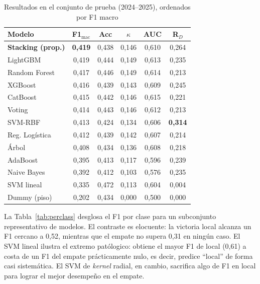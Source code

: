 \documentclass[conference]{IEEEtran}
\begin{document}
\begin{table}[t]
\caption{Resultados en el conjunto de prueba (2024--2025), ordenados por F1 macro}
\label{tab:results}
\centering
\footnotesize
\begin{tabular}{@{}lccccc@{}}
\toprule
\textbf{Modelo} & \textbf{F1$_\text{mac}$} & \textbf{Acc} & \textbf{$\kappa$} & \textbf{AUC} & \textbf{R$_D$} \\
\midrule
\textbf{Stacking (prop.)} & \textbf{0,419} & 0,438 & 0,146 & 0,610 & 0,264 \\
LightGBM        & 0,419 & 0,444 & 0,149 & 0,613 & 0,235 \\
Random Forest   & 0,417 & 0,446 & 0,149 & 0,614 & 0,213 \\
XGBoost         & 0,416 & 0,439 & 0,143 & 0,609 & 0,245 \\
CatBoost        & 0,415 & 0,442 & 0,146 & 0,615 & 0,221 \\
Voting          & 0,414 & 0,443 & 0,146 & 0,612 & 0,213 \\
SVM-RBF         & 0,413 & 0,424 & 0,134 & 0,606 & \textbf{0,314} \\
Reg. Log\'istica & 0,412 & 0,439 & 0,142 & 0,607 & 0,214 \\
\'Arbol         & 0,408 & 0,434 & 0,136 & 0,608 & 0,218 \\
AdaBoost        & 0,395 & 0,413 & 0,117 & 0,596 & 0,239 \\
Naive Bayes     & 0,392 & 0,412 & 0,103 & 0,576 & 0,235 \\
SVM lineal      & 0,335 & 0,472 & 0,113 & 0,604 & 0,004 \\
Dummy (piso)    & 0,202 & 0,434 & 0,000 & 0,500 & 0,000 \\
\bottomrule
\end{tabular}
\end{table}

La Tabla~\ref{tab:perclass} desglosa el F1 por clase para un subconjunto representativo de
modelos. El contraste es elocuente: la victoria local alcanza un F1 cercano a 0,52, mientras
que el empate no supera 0,31 en ning\'un caso. El SVM lineal ilustra el extremo pat\'ologico:
obtiene el mayor F1 de local (0,61) a costa de un F1 del empate pr\'acticamente nulo, es
decir, predice ``local'' de forma casi sistem\'atica. El SVM de \emph{kernel} radial, en
cambio, sacrifica algo de F1 en local para lograr el mejor desempe\~no en el empate.
\end{document}
